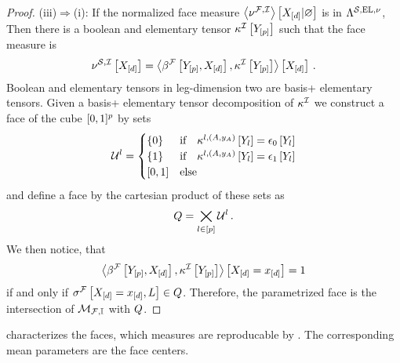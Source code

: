 \begin{proof}
    (iii)$\Rightarrow$(i):
    If the normalized face measure $\left\langle \nu^{\mathcal{F},\mathcal{I}}\right\rangle \left[ X_{[d]} | \varnothing \right]$ is in $\Lambda^{\mathcal{S},\mathrm{EL},\nu}$,
    Then there is a boolean and elementary tensor $\kappa^{\mathcal{I}}\left[Y_{[p]}\right]$ such that the face measure is
    \begin{align*}
        \nu^{\mathcal{S},\mathcal{I}}\left[X_{[d]}\right]
        = \left\langle \beta^{\mathcal{F}}\left[Y_{[p]},X_{[d]}\right],\kappa^{\mathcal{I}}\left[Y_{[p]}\right]\right\rangle \left[ X_{[d]} \right] \, .
    \end{align*}
    Boolean and elementary tensors in leg-dimension two are basis+ elementary tensors.
    Given a basis+ elementary tensor decomposition of $\kappa^{\mathcal{I}}$ we construct a face of the cube $[0,1]^{p}$ by sets
    \begin{align*}
        \mathcal{U}^{l} = \begin{cases}
                                   \{0\} & \text{if}\quad \kappa^{l,(A,y_{A})}\left[Y_{l}\right] = \epsilon_{0}\left[Y_{l}\right] \\
                                   \{1\} & \text{if}\quad \kappa^{l,(A,y_{A})}\left[Y_{l}\right] = \epsilon_{1}\left[Y_{l}\right] \\
                                   [0,1] & \text{else}
        \end{cases}
    \end{align*}
    and define a face by the cartesian product of these sets as
    \begin{align*}
        Q = \bigtimes_{l\in[p]} \mathcal{U}^{l} \, .
    \end{align*}
    We then notice, that
    \begin{align*}
        \left\langle \beta^{\mathcal{F}}\left[Y_{[p]},X_{[d]}\right],\kappa^{\mathcal{I}}\left[Y_{[p]}\right]\right\rangle \left[ X_{[d]}=x_{[d]} \right] = 1
    \end{align*}
    if and only if $\sigma^{\mathcal{F}}\left[X_{[d]}=x_{[d]},L\right]\in Q$.
    Therefore, the parametrized face is the intersection of $\mathcal{M}_{\mathcal{F},\mathbb{I}}$ with $Q$.
\end{proof}

 characterizes the faces, which measures are reproducable by \HardLogicNetworks{}.
The corresponding mean parameters are the face centers.



